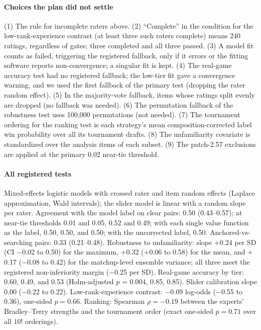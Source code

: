 \documentclass[journal]{IEEEtran}
\begin{document}
\paragraph{Choices the plan did not settle} (1) The rule for incomplete raters above. (2) ``Complete'' in the condition for the low-rank-experience contrast (at least three such raters complete) means 240 ratings, regardless of gates; three completed and all three passed. (3) A model fit counts as failed, triggering the registered fallback, only if it errors or the fitting software reports non-convergence; a singular fit is kept. (4) The real-game accuracy test had no registered fallback; the low-tier fit gave a convergence warning, and we used the first fallback of the primary test (dropping the rater random effect). (5) In the majority-vote fallback, items whose ratings split evenly are dropped (no fallback was needed). (6) The permutation fallback of the robustness test uses 100,000 permutations (not needed). (7) The tournament ordering for the ranking test is each strategy's mean composition-corrected label win probability over all its tournament drafts. (8) The unfamiliarity covariate is standardized over the analysis items of each subset. (9) The patch-2.57 exclusions are applied at the primary 0.02 near-tie threshold.

\paragraph{All registered tests} Mixed-effects logistic models with crossed rater and item random effects (Laplace approximation, Wald intervals); the slider model is linear with a random slope per rater. Agreement with the model label on clear pairs: 0.50 (0.43--0.57); at near-tie thresholds 0.01 and 0.05, 0.52 and 0.49; with each single value function as the label, 0.50, 0.50, and 0.50; with the uncorrected label, 0.50. Anchored-vs-searching pairs: 0.33 (0.21--0.48). Robustness to unfamiliarity: slope $+$0.24 per SD (CI $-$0.02 to 0.50) for the maximum, $+$0.32 ($+$0.06 to 0.58) for the mean, and $+$0.17 ($-$0.08 to 0.42) for the matchup-level ensemble variance; all three meet the registered non-inferiority margin ($-$0.25 per SD). Real-game accuracy by tier: 0.60, 0.49, and 0.53 (Holm-adjusted $p$ = 0.004, 0.85, 0.85). Slider calibration slope 0.00 ($-$0.22 to 0.22). Low-rank-experience contrast: $-$0.09 log-odds ($-$0.55 to 0.36), one-sided $p = 0.66$. Ranking: Spearman $\rho = -0.19$ between the experts' Bradley--Terry strengths and the tournament order (exact one-sided $p = 0.71$ over all $10!$ orderings).
\end{document}
